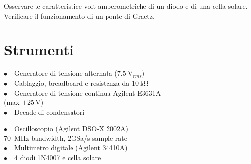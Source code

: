 Osservare le caratteristice volt-amperometriche di un diodo e di una cella solare. Verificare il funzionamento di un ponte di Graetz.

\section{Strumenti}
%
\phantom{porcodio!}
\noindent
\begin{minipage}{.5\linewidth}
$\bullet \quad$Generatore di tensione alternata ($\SI{7.5}{\volt}_{rms}$)\\
$\bullet \quad$Cablaggio, breadboard e resistenza da $\SI{10}{\kilo\ohm}$\\
$\bullet \quad$Generatore di tensione continua Agilent E3631A\\
\phantom{figa}(max $\pm \SI{25}{\volt}$)\\
$\bullet \quad$Decade di condensatori
\end{minipage}%
\begin{minipage}{.5\linewidth}
$\bullet \quad$Oscilloscopio (Agilent DSO-X 2002A)\\
\phantom{xxxx}\SI{70}{\mega\hertz} bandwidth, 2GSa/s sample rate\\
$\bullet \quad$Multimetro digitale (Agilent 34410A)\\
$\bullet \quad$4 diodi 1N4007 e cella solare
\end{minipage}